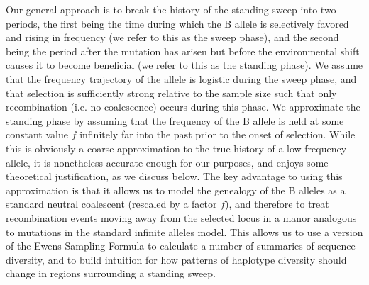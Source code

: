\documentclass[a4paper,10pt]{article}
\newcommand{\jb}[1]{{\it\color{blue} (#1)} }
\begin{document}
Our general approach is to break the history of the standing sweep into two periods, the first being the time during which the B allele is selectively favored and rising in frequency (we refer to this as the sweep phase), and the second being the period after the mutation has arisen but before the environmental shift causes it to become beneficial (we refer to this as the standing phase). We assume that the frequency trajectory of the allele is logistic during the sweep phase, and that selection is sufficiently strong relative to the sample size such that only recombination (i.e. no coalescence) occurs during this phase. We approximate the standing phase by assuming that the frequency of the B allele is held at some constant value $f$ infinitely far into the past prior to the onset of selection. While this is obviously a coarse approximation to the true history of a low frequency allele, it is nonetheless accurate enough for our purposes, and enjoys some theoretical justification, as we discuss below. The key advantage to using this approximation is that it allows us to model the genealogy of the B alleles as a standard neutral coalescent (rescaled by a factor $f$), and therefore to treat recombination events moving away from the selected locus in a manor analogous to mutations in the standard infinite alleles model. This allows us to use a version of the Ewens Sampling Formula to calculate a number of summaries of sequence diversity, and to build intuition for how patterns of haplotype diversity should change in regions surrounding a standing sweep.

\end{document}
